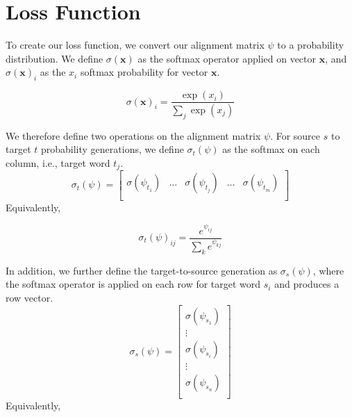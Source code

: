 \documentclass[twoside,twocolumn]{article}
\renewcommand{\vec}[1]{\mathbf{#1}}
\newlength\mystoreparindent
\newenvironment{myparindent}[1]{%
  \setlength{\mystoreparindent}{\the\parindent}
  \setlength{\parindent}{#1}
  }{%
  \setlength{\parindent}{\mystoreparindent}
}
\begin{document}





\clearpage
\appendix
\onecolumn
\begin{myparindent}{0pt}
\section{Loss Function}
\label{appendix:loss-function}
To create our loss function, we convert our alignment matrix $\psi$
to a probability distribution. We define $\sigma(\vec{x})$ as
the softmax operator applied on vector $\vec{x}$, and $\sigma(\vec{x})_i$ as
the $x_i$ softmax probability for vector $\vec{x}$.

\begin{equation}
\sigma(\vec{x})_i = \frac{\exp(x_i)}{\sum_j\exp(x_j)}
\end{equation}

We therefore define two operations on the alignment matrix $\psi$. For source
$s$ to target $t$ probability generations, we define $\sigma_t(\psi)$ as the
softmax on each column, i.e., target word $t_j$.
\begin{equation}
  \sigma_t(\psi) = \left[
    \begin{matrix}
      \sigma(\psi_{t_1}) &
      \hdots &
      \sigma(\psi_{t_j}) &
      \hdots &
      \sigma(\psi_{t_m})  \\
    \end{matrix}
\right]
\end{equation}
Equivalently,

\begin{equation}
  \sigma_t(\psi)_{ij} = \frac{e^{\psi_{ij}}}{\sum_{k} e^{\psi_{kj}}}
\end{equation}

In addition, we further define the target-to-source generation as
$\sigma_s(\psi)$, where the softmax operator is applied on each row for target
word $s_i$ and produces a row vector.
\begin{equation}
  \sigma_s(\psi) = \left[
    \begin{matrix}
      \sigma(\psi_{s_1})  \\
      \vdots \\
      \sigma(\psi_{s_i})  \\
      \vdots \\
      \sigma(\psi_{s_n})  \\
    \end{matrix}
\right]
\end{equation}
Equivalently,


\end{myparindent}
\end{document}
